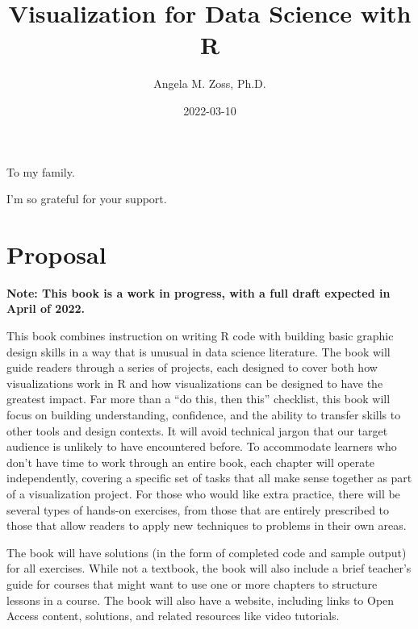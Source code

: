 \documentclass[
]{krantz}
\title{Visualization for Data Science with R}
\author{Angela M. Zoss, Ph.D.}
\date{2022-03-10}
\begin{document}
\maketitle


\thispagestyle{empty}

\begin{center}
To my family.

I'm so grateful for your support.
\end{center}

\setlength{\abovedisplayskip}{-5pt}
\setlength{\abovedisplayshortskip}{-5pt}

{
\hypersetup{linkcolor=}
\setcounter{tocdepth}{2}
\tableofcontents
}
\listoffigures
\listoftables
\hypertarget{proposal}{%
\chapter*{Proposal}\label{proposal}}


\textbf{Note: This book is a work in progress, with a full draft expected in April of 2022.}

This book combines instruction on writing R code with building basic graphic design skills in a way that is unusual in data science literature. The book will guide readers through a series of projects, each designed to cover both how visualizations work in R and how visualizations can be designed to have the greatest impact. Far more than a ``do this, then this'' checklist, this book will focus on building understanding, confidence, and the ability to transfer skills to other tools and design contexts. It will avoid technical jargon that our target audience is unlikely to have encountered before. To accommodate learners who don't have time to work through an entire book, each chapter will operate independently, covering a specific set of tasks that all make sense together as part of a visualization project. For those who would like extra practice, there will be several types of hands-on exercises, from those that are entirely prescribed to those that allow readers to apply new techniques to problems in their own areas.

The book will have solutions (in the form of completed code and sample output) for all exercises. While not a textbook, the book will also include a brief teacher's guide for courses that might want to use one or more chapters to structure lessons in a course. The book will also have a website, including links to Open Access content, solutions, and related resources like video tutorials.
\end{document}
